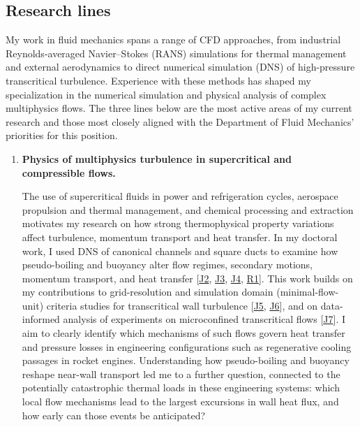 \documentclass[11pt]{article}
\begin{document}
\subsection{Research lines}\label{sec:lines}

My work in fluid mechanics spans a range of CFD approaches, from industrial Reynolds-averaged Navier--Stokes (RANS) simulations for thermal management and external aerodynamics to direct numerical simulation (DNS) of high-pressure transcritical turbulence. Experience with these methods has shaped my specialization in the numerical simulation and physical analysis of complex multiphysics flows. The three lines below are the most active areas of my current research and those most closely aligned with the Department of Fluid Mechanics' priorities for this position.

\begin{enumerate}[label=\textbf{\arabic*.}, leftmargin=*, itemsep=8pt]
	
	\item \textbf{Physics of multiphysics turbulence in supercritical and compressible flows.}
	
	The use of supercritical fluids in power and refrigeration cycles, aerospace propulsion and thermal management, and chemical processing and extraction motivates my research on how strong thermophysical property variations affect turbulence, momentum transport and heat transfer. In my doctoral work, I used DNS of canonical channels and square ducts to examine how pseudo-boiling and buoyancy alter 	flow regimes, secondary motions, momentum transport, and heat transfer [\hyperlink{pub-J2}{J2}, \hyperlink{pub-J3}{J3}, \hyperlink{pub-J4}{J4}, \hyperlink{pub-R1}{R1}]. This work builds on my contributions to grid-resolution and simulation domain (minimal-flow-unit) criteria studies for transcritical wall turbulence [\hyperlink{pub-J5}{J5}, \hyperlink{pub-J6}{J6}], and on data-informed analysis of experiments on microconfined transcritical flows [\hyperlink{pub-J7}{J7}].
	I aim to clearly identify which mechanisms of such flows govern heat transfer and pressure losses in engineering configurations such as regenerative cooling passages in rocket engines. 
	Understanding how pseudo-boiling and buoyancy reshape near-wall transport led me to a further question, connected to the potentially catastrophic thermal loads in these engineering systems: which local flow mechanisms lead to the largest excursions in wall heat flux, and how early can those events be anticipated?
	

\end{enumerate}
\end{document}
